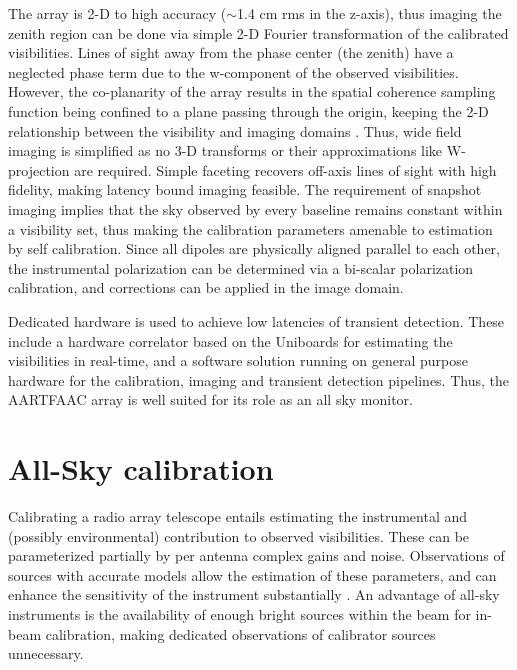\documentclass{aa}
\begin{document}
The array is 2-D to high accuracy ($\sim$1.4 cm rms in the z-axis), thus imaging
the zenith  region can be done  via simple \mbox{2-D}  Fourier transformation of
the calibrated  visibilities.  Lines  of sight away  from the phase  center (the
zenith)  have a  neglected phase  term due  to the  w-component of  the observed
visibilities.  However,  the co-planarity  of the array  results in  the spatial
coherence  sampling function  being  confined  to a  plane  passing through  the
origin, keeping the 2-D relationship  between the visibility and imaging domains
\citep{cornwell1992radio}.   Thus, wide field  imaging is  simplified as  no 3-D
transforms       or      their       approximations       like      W-projection
\textbf{\citep{cornwell2008noncoplanar}} are required.  Simple faceting recovers
off-axis  lines  of sight  with  high  fidelity,  making latency  bound  imaging
feasible. The requirement  of snapshot imaging implies that  the sky observed by
every  baseline  remains constant  within  a  visibility  set, thus  making  the
calibration parameters  amenable to estimation  by self calibration.   Since all
dipoles  are  physically  aligned  parallel  to  each  other,  the  instrumental
polarization  can be determined  via a  bi-scalar polarization  calibration, and
corrections can be applied in the image domain.

Dedicated  hardware is  used to  achieve low  latencies of  transient detection.
These include  a hardware correlator based  on the Uniboards  for estimating the
visibilities in  real-time, and a  software solution running on  general purpose
hardware for  the calibration, imaging and transient  detection pipelines. Thus,
the AARTFAAC array is well suited for its role as an all sky monitor.

\section{\label{sec:Array-calibration-for}All-Sky calibration}
Calibrating  a radio  array telescope  entails estimating  the  instrumental and
(possibly environmental)  contribution to  observed visibilities.  These  can be
parameterized partially by per antenna  complex gains and noise. Observations of
sources with accurate  models allow the estimation of  these parameters, and can
enhance     the     sensitivity      of     the     instrument     substantially
\citep{taylor1999synthesis}.   An  advantage   of  all-sky  instruments  is  the
availability of enough  bright sources within the beam  for in-beam calibration,
making dedicated observations of calibrator sources unnecessary.
\end{document}
